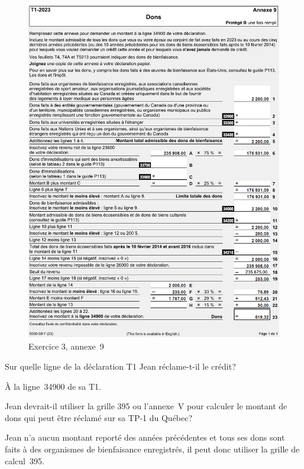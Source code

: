 \begin{figure}
	\centering
	\includegraphics[width=.9\textwidth]{exercice/7-3/Q5/Annexe9.png}
	\caption[]{Exercice 3, annexe~9}
	\label{fig:chap7Exercice3Annexe9}
\end{figure}

\begin{sousQuestion}
	Sur quelle ligne de la déclaration T1 Jean réclame-t-il le crédit?
\end{sousQuestion}
À la ligne~34900 de sa T1.

\begin{sousQuestion}
	Jean devrait-il utiliser la grille 395 ou l'annexe~V pour calculer le montant de dons qui peut être réclamé sur sa TP-1 du Québec?
\end{sousQuestion}
Jean n'a aucun montant reporté des années précédentes et tous ses dons sont faits à des organismes de bienfaisance enregistrés, il peut donc utiliser la grille de calcul~395.

